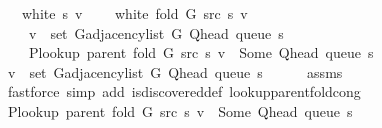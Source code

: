 \begin{isabellebody}
\ \ \ {\isachardoublequoteopen}white\ s\ v{\isachardoublequoteclose}\isanewline
\ \ \ {\isachardoublequoteopen}{\isasymnot}\ white\ {\isacharparenleft}{\kern0pt}fold\ G\ src\ s{\isacharparenright}{\kern0pt}\ v{\isachardoublequoteclose}\isanewline
\ \ \isanewline
\ \ \ \ {\isachardoublequoteopen}v\ {\isasymin}\ set\ {\isacharparenleft}{\kern0pt}G{\isachardot}{\kern0pt}adjacency{\isacharunderscore}{\kern0pt}list\ G\ {\isacharparenleft}{\kern0pt}Q{\isacharunderscore}{\kern0pt}head\ {\isacharparenleft}{\kern0pt}queue\ s{\isacharparenright}{\kern0pt}{\isacharparenright}{\kern0pt}{\isacharparenright}{\kern0pt}{\isachardoublequoteclose}\isanewline
\ \ \ \ {\isachardoublequoteopen}P{\isacharunderscore}{\kern0pt}lookup\ {\isacharparenleft}{\kern0pt}parent\ {\isacharparenleft}{\kern0pt}fold\ G\ src\ s{\isacharparenright}{\kern0pt}{\isacharparenright}{\kern0pt}\ v\ {\isacharequal}{\kern0pt}\ Some\ {\isacharparenleft}{\kern0pt}Q{\isacharunderscore}{\kern0pt}head\ {\isacharparenleft}{\kern0pt}queue\ s{\isacharparenright}{\kern0pt}{\isacharparenright}{\kern0pt}{\isachardoublequoteclose}%
\endisataginvisible
{\isafoldinvisible}%
%
\isadeliminvisible
\isanewline
%
\endisadeliminvisible
%
\isadelimproof
%
\endisadelimproof
%
\isatagproof
{}\isamarkupfalse%
\ {\isacharminus}{\kern0pt}\isanewline
\ \ \isamarkupfalse%
\ {\isachardoublequoteopen}v\ {\isasymin}\ set\ {\isacharparenleft}{\kern0pt}G{\isachardot}{\kern0pt}adjacency{\isacharunderscore}{\kern0pt}list\ G\ {\isacharparenleft}{\kern0pt}Q{\isacharunderscore}{\kern0pt}head\ {\isacharparenleft}{\kern0pt}queue\ s{\isacharparenright}{\kern0pt}{\isacharparenright}{\kern0pt}{\isacharparenright}{\kern0pt}{\isachardoublequoteclose}\isanewline
\ \ \ \ \isamarkupfalse%
\ assms\isanewline
\ \ \ \ \isamarkupfalse%
\ {\isacharparenleft}{\kern0pt}fastforce\ simp\ add{\isacharcolon}{\kern0pt}\ is{\isacharunderscore}{\kern0pt}discovered{\isacharunderscore}{\kern0pt}def\ lookup{\isacharunderscore}{\kern0pt}parent{\isacharunderscore}{\kern0pt}fold{\isacharunderscore}{\kern0pt}cong{\isacharparenright}{\kern0pt}\isanewline
\ \ \isamarkupfalse%
\ {\isachardoublequoteopen}P{\isacharunderscore}{\kern0pt}lookup\ {\isacharparenleft}{\kern0pt}parent\ {\isacharparenleft}{\kern0pt}fold\ G\ src\ s{\isacharparenright}{\kern0pt}{\isacharparenright}{\kern0pt}\ v\ {\isacharequal}{\kern0pt}\ Some\ {\isacharparenleft}{\kern0pt}Q{\isacharunderscore}{\kern0pt}head\ {\isacharparenleft}{\kern0pt}queue\ s{\isacharparenright}{\kern0pt}{\isacharparenright}{\kern0pt}{\isachardoublequoteclose}\isanewline

\end{isabellebody}
